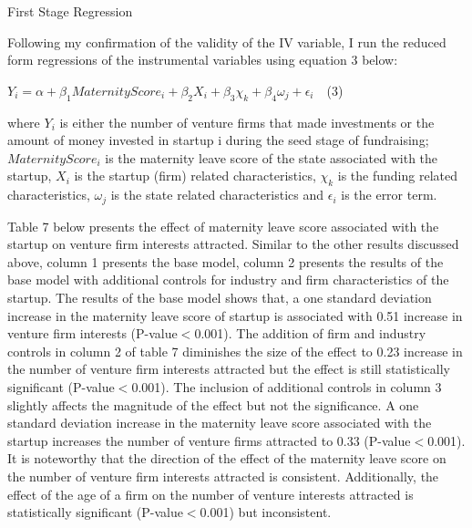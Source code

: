 \begin{table}[H]
 \captionsetup{justification=raggedright,singlelinecheck=false}
    \caption{First Stage Regression}
        
\end{table}

Following my confirmation of the validity of the IV variable, I run the reduced form regressions of the instrumental variables using equation 3 below: 

\begin{center}
$Y_{i}=\alpha +\beta_1Maternity Score_i+\beta_2X_{i} + \beta_{3}\chi_{k} + \beta_4\omega_{j}  + \epsilon_{i} \quad $(3)$ $
\end{center}

\noindent where $Y_{i}$ is either the number of venture firms that made investments or the amount of money invested in startup i during the seed stage of fundraising;  $Maternity Score_i$ is the maternity leave score of the state associated with the startup, $X_{i}$ is the startup (firm) related characteristics, $\chi_{k}$ is the funding related characteristics, $\omega_{j} $ is the state related characteristics and $\epsilon_{i}$ is the error term. 

Table 7 below presents the effect of maternity leave score associated with the startup on venture firm interests attracted. Similar to the other results discussed above, column 1 presents the base model, column 2 presents the results of the base model with additional controls for industry and firm characteristics of the startup. The results of the base model shows that, a one standard deviation increase in the maternity leave score of startup is associated with 0.51 increase in venture firm interests (P-value$<$0.001). The addition of firm and industry controls in column 2 of table 7 diminishes the size of the effect to 0.23 increase in the number of venture firm interests attracted but the effect is still statistically significant (P-value$<$0.001). The inclusion of additional controls in column 3 slightly affects the magnitude of the effect but not the significance. A one standard deviation increase in the maternity leave score associated with the startup increases the number of venture firms attracted to 0.33 (P-value$<$0.001). It is noteworthy that the direction of the effect of the maternity leave score on the number of venture firm interests attracted is consistent. Additionally, the effect of the age of a firm on the number of venture interests attracted is statistically significant (P-value$<$0.001) but inconsistent. 

